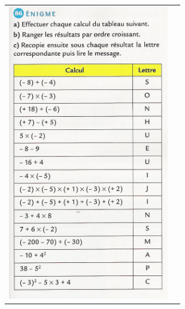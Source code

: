 \documentclass[12pt, twoside]{article}
\begin{document}
\begin{tabular}{cc}
\begin{minipage}{9cm}
\includegraphics[width=7cm]{images/pb.jpg}
\end{minipage}
\end{tabular}



















 
\end{document}
